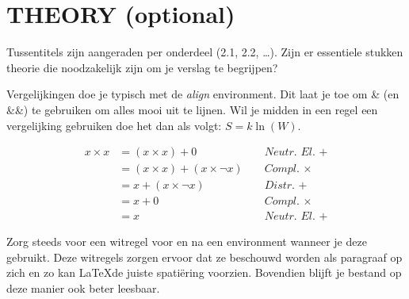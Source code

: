 \section{THEORY (optional)}
Tussentitels zijn aangeraden per onderdeel (2.1, 2.2, \dots).
Zijn er essentiele stukken theorie die noodzakelijk zijn om je verslag te begrijpen?

Vergelijkingen doe je typisch met de \textit{align} environment.
Dit laat je toe om \& (en \&\&) te gebruiken om alles mooi uit te lijnen.
Wil je midden in een regel een vergelijking gebruiken doe het dan als volgt: $S = k\ln(W)$.

    \begin{align}
    x \times x   &= (x \times x) + 0  &&\textit{ Neutr. El. }+\\
            &= (x \times x) + (x \times \neg x) && \textit{ Compl. }\times \\
            &= x + (x \times \neg x) && \textit{ Distr. }+ \\
            &= x + 0 && \textit{ Compl. }\times\\
            &= x && \textit{ Neutr. El. }+ \label{eq:ne}
    \end{align}

Zorg steeds voor een witregel voor en na een environment wanneer je deze gebruikt. 
Deze witregels zorgen ervoor dat ze beschouwd worden als paragraaf op zich en zo kan \LaTeX de juiste spati\"ering voorzien.
Bovendien blijft je bestand op deze manier ook beter leesbaar.

